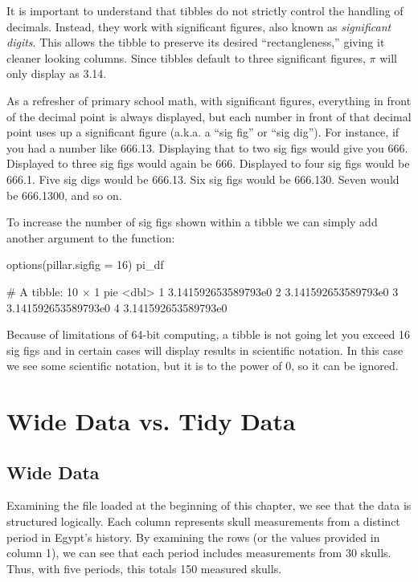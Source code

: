 \noindent
It is important to understand that tibbles do not strictly control the handling of decimals. Instead, they work with \gls{significant figures}, also known as \textit{significant digits}.  This allows the tibble to preserve its desired ``rectangleness,'' giving it cleaner looking columns. Since tibbles default to three significant figures, $\pi$ will only display as 3.14. 

As a refresher of primary school math, with significant figures, everything in front of the decimal point is always displayed, but each number in front of that decimal point uses up a significant figure (a.k.a. a ``sig fig'' or ``sig dig''). For instance, if you had a number like 666.13.  Displaying that to two sig figs would give you 666.  Displayed to three sig figs would again be 666. Displayed to four sig figs would be 666.1. Five sig digs would be 666.13. Six sig figs would be 666.130. Seven would be 666.1300, and so on.

To increase the number of sig figs shown within a tibble we can simply add another argument to the  function:

\begin{inR}
options(pillar.sigfig = 16)
pi_df
\end{inR}
\begin{outR}
# A tibble: 10 × 1
                   pie
                 <dbl>
 1 3.141592653589793e0
 2 3.141592653589793e0
 3 3.141592653589793e0
 4 3.141592653589793e0
\end{outR}

Because of limitations of 64-bit computing, a tibble is not going let you exceed 16 sig figs and in certain cases will display results in scientific notation. In this case we see some scientific notation, but it is to the power of 0, so it can be ignored.

\section{Wide Data vs. Tidy Data}

\subsection{Wide Data}
\label{sec:wide_data}

Examining the  file loaded at the beginning of this chapter, we see that the data is structured logically. Each column represents skull measurements from a distinct period in Egypt’s history. By examining the rows (or the values provided in column 1), we can see that each period includes measurements from 30 skulls. Thus, with five periods, this totals 150 measured skulls.

